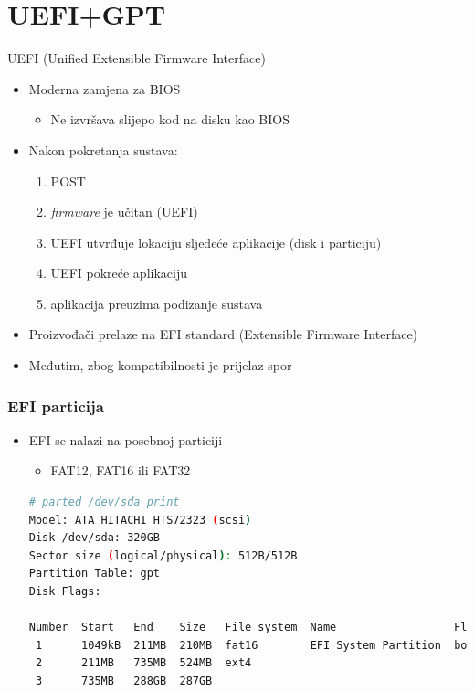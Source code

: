\documentclass[croatian,t]{beamer} %
\begin{document}
	\section{UEFI+GPT}
    \begin{frame}{UEFI (Unified Extensible Firmware Interface)}
    	\begin{itemize}
    		\item Moderna zamjena za BIOS
    		\begin{itemize}
    			\item Ne izvršava slijepo kod na disku kao BIOS
    		\end{itemize}
    		\item Nakon pokretanja sustava:
    			\begin{enumerate}
    				\item POST
    				\item \emph{firmware} je učitan (UEFI)
    				\item UEFI utvrđuje lokaciju sljedeće aplikacije (disk i particiju)
    				\item UEFI pokreće aplikaciju
    				\item aplikacija preuzima podizanje sustava
    			\end{enumerate}
    		\item Proizvođači prelaze na EFI standard (Extensible Firmware Interface)
    		\item Međutim, zbog kompatibilnosti je prijelaz spor
    	\end{itemize}
    \end{frame}
    
	\begin{frame}[fragile] %
	\frametitle{EFI particija}
		\begin{itemize}
		\item EFI se nalazi na posebnoj particiji
			\begin{itemize}
				\item FAT12, FAT16 ili FAT32
			\end{itemize}
		\begin{lstlisting}[basicstyle={\tiny\ttfamily},language=bash]
# parted /dev/sda print
Model: ATA HITACHI HTS72323 (scsi)
Disk /dev/sda: 320GB
Sector size (logical/physical): 512B/512B
Partition Table: gpt
Disk Flags: 

Number  Start   End    Size   File system  Name                  Flags
 1      1049kB  211MB  210MB  fat16        EFI System Partition  boot
 2      211MB   735MB  524MB  ext4
 3      735MB   288GB  287GB   
 		\end{lstlisting}
		\end{itemize}
	\end{frame}
    
\end{document}
